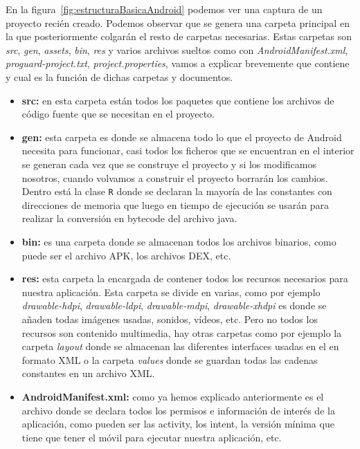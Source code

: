 En la figura~\ref{fig:estructuraBasicaAndroid} podemos ver una captura de un proyecto recién creado. Podemos observar que se genera una carpeta principal en la que posteriormente colgarán el resto de carpetas necesarias. Estas carpetas son \textit{src}, \textit{gen}, \textit{assets}, \textit{bin}, \textit{res} y varios archivos sueltos como con \textit{AndroidManifest.xml}, \textit{proguard-project.txt}, \textit{project.properties}, vamos a explicar brevemente que contiene y cual es la función de dichas carpetas y documentos.

\begin{itemize}

\item \textbf{src:} en esta carpeta están todos los paquetes que contiene los archivos de código fuente que se necesitan en el proyecto.

\item \textbf{gen:} esta carpeta es donde se almacena todo lo que el proyecto de Android necesita para funcionar, casi todos los ficheros que se encuentran en el interior se generan cada vez que se construye el proyecto y si los modificamos nosotros, cuando volvamos a construir el proyecto borrarán los cambios. Dentro está la clase \lstinline{R} donde se declaran la mayoría de las constantes con direcciones de memoria que luego en tiempo de ejecución se usarán para realizar la conversión en bytecode del archivo java.

\item \textbf{bin:} es una carpeta donde se almacenan todos los archivos binarios, como puede ser el archivo APK, los archivos DEX, etc.

\item \textbf{res:} esta carpeta la encargada de contener todos los recursos necesarios para nuestra aplicación. Esta carpeta se divide en varias, como por ejemplo \textit{drawable-hdpi}, \textit{drawable-ldpi}, \textit{drawable-mdpi}, \textit{drawable-xhdpi} es donde se añaden todas imágenes usadas, sonidos, vídeos, etc. Pero no todos los recursos son contenido multimedia, hay otras carpetas como por ejemplo la carpeta \textit{layout} donde se almacenan las diferentes interfaces usadas en el en formato XML o la carpeta \textit{values} donde se guardan todas las cadenas constantes en un archivo XML.

\item \textbf{AndroidManifest.xml:} como ya hemos explicado anteriormente es el archivo donde se declara todos los permisos e información de interés de la aplicación, como pueden ser las activity, los intent, la versión mínima que tiene que tener el móvil para ejecutar nuestra aplicación, etc.  


\end{itemize}
